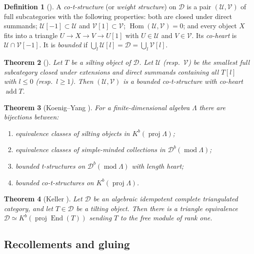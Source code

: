 \documentclass[11pt,reqno]{amsart}
\theoremstyle{plain}
\newtheorem{theorem}{Theorem}[section]
\theoremstyle{definition}
\newtheorem{definition}[theorem]{Definition}
\theoremstyle{remark}
\DeclareMathOperator{\Hom}{Hom}
\DeclareMathOperator{\End}{End}
\DeclareMathOperator{\add}{add}
\newcommand{\modd}{\operatorname{mod}}
\newcommand{\proj}{\operatorname{proj}}
\newcommand{\Db}{\mathcal{D}^b}
\newcommand{\Kb}{K^b}
\newcommand{\cD}{\mathcal{D}}
\newcommand{\cU}{\mathcal{U}}
\newcommand{\cV}{\mathcal{V}}
\begin{document}
\begin{definition}[{\cite{Bon10,Pau08}}]
A \emph{co-t-structure} (or \emph{weight structure}) on $\cD$ is a pair $(\cU,\cV)$ of full subcategories with the following properties: both are closed under direct summands; $\cU[-1]\subset\cU$ and $\cV[1]\subset\cV$; $\Hom(\cU,\cV)=0$; and every object $X$ fits into a triangle $U\to X\to V\to U[1]$ with $U\in\cU$ and $V\in\cV$. Its \emph{co-heart} is $\cU\cap\cV[-1]$. It is \emph{bounded} if $\bigcup_l\cU[l]=\cD=\bigcup_l\cV[l]$.
\end{definition}

\begin{theorem}[{\cite{Bon10,AI12}}]\label{thm:silting-cot}
Let $T$ be a silting object of $\cD$. Let $\cU$ (resp.\ $\cV$) be the smallest full subcategory closed under extensions and direct summands containing all $T[l]$ with $l\le0$ (resp.\ $l\ge1$). Then $(\cU,\cV)$ is a bounded co-t-structure with co-heart $\add T$.
\end{theorem}

\begin{theorem}[{Koenig--Yang \cite[Thm.~6.1]{KY14}}]\label{thm:KY}
For a finite-dimensional algebra $\Lambda$ there are bijections between:
\begin{enumerate}
\item equivalence classes of silting objects in $\Kb(\proj\Lambda)$;
\item equivalence classes of simple-minded collections in $\Db(\modd\Lambda)$;
\item bounded t-structures on $\Db(\modd\Lambda)$ with length heart;
\item bounded co-t-structures on $\Kb(\proj\Lambda)$.
\end{enumerate}
\end{theorem}

\begin{theorem}[{Keller \cite{Kel94}}]\label{thm:keller}
Let $\cD$ be an algebraic idempotent complete triangulated category, and let $T\in\cD$ be a tilting object. Then there is a triangle equivalence $\cD\simeq\Kb(\proj\End(T))$ sending $T$ to the free module of rank one.
\end{theorem}

\subsection{Recollements and gluing}
\end{document}
